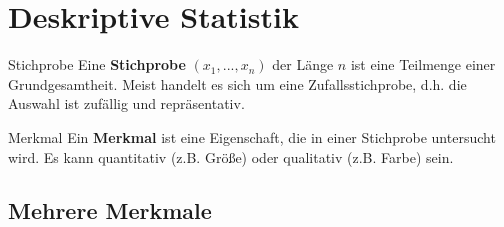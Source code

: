 \section{Deskriptive Statistik}

\begin{definition}{Stichprobe}
    Eine \textbf{Stichprobe} $(x_1,...,x_n)$ der Länge $n$ ist eine Teilmenge einer Grundgesamtheit. 
    Meist handelt es sich um eine Zufallsstichprobe, d.h. die Auswahl ist zufällig und repräsentativ.
\end{definition}

\begin{definition}{Merkmal}
    Ein \textbf{Merkmal} ist eine Eigenschaft, die in einer Stichprobe untersucht wird. 
    Es kann quantitativ (z.B. Größe) oder qualitativ (z.B. Farbe) sein.
    
\end{definition}

\subsection{Mehrere Merkmale}